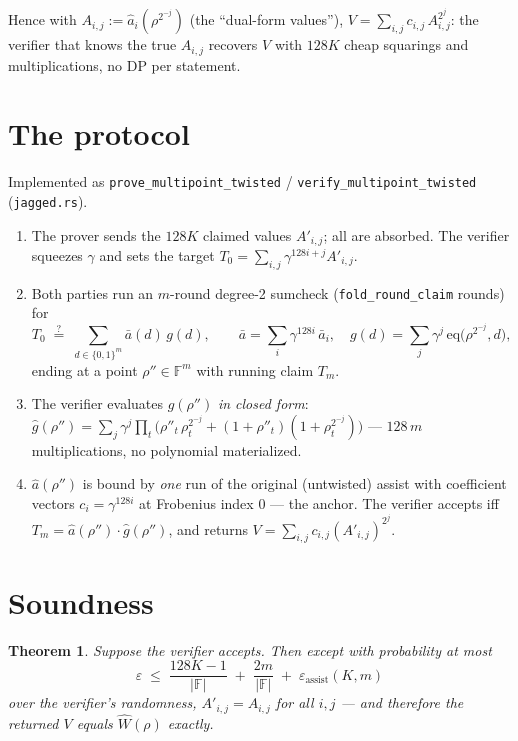 \documentclass[11pt]{article}
\newtheorem{theorem}{Theorem}
\newcommand{\F}{\mathbb{F}}
\newcommand{\eq}{\mathrm{eq}}
\newcommand{\code}[1]{\texttt{#1}}
\begin{document}
Hence with $A_{i,j} := \hat a_i(\rho^{2^{-j}})$ (the ``dual-form values''),
$V = \sum_{i,j} c_{i,j}\, A_{i,j}^{2^j}$: the verifier that knows the true
$A_{i,j}$ recovers $V$ with $128K$ cheap squarings and multiplications, no
DP per statement.

\section{The protocol}

Implemented as \code{prove\_multipoint\_twisted} /
\code{verify\_multipoint\_twisted} (\code{jagged.rs}).

\begin{enumerate}[nosep]
  \item The prover sends the $128K$ claimed values $A'_{i,j}$; all are
        absorbed. The verifier squeezes $\gamma$ and sets the target
        $T_0 = \sum_{i,j} \gamma^{128 i + j} A'_{i,j}$.
  \item Both parties run an $m$-round degree-2 sumcheck
        (\code{fold\_round\_claim} rounds) for
        \[
          T_0 \;\stackrel{?}{=}\; \sum_{d\in\{0,1\}^m} \bar a(d)\, g(d),
          \qquad
          \bar a = \sum_i \gamma^{128 i}\,\bar a_i,\quad
          g(d) = \sum_j \gamma^{j}\,\eq\bigl(\rho^{2^{-j}},d\bigr),
        \]
        ending at a point $\rho''\in\F^m$ with running claim $T_m$.
  \item The verifier evaluates $\hat g(\rho'')$ \emph{in closed form}:
        $\hat g(\rho'') = \sum_j \gamma^j \prod_t \bigl(\rho''_t\,
        \rho^{2^{-j}}_t + (1+\rho''_t)(1+\rho^{2^{-j}}_t)\bigr)$ — $128\,m$
        multiplications, no polynomial materialized.
  \item $\hat a(\rho'')$ is bound by \emph{one} run of the original
        (untwisted) assist with coefficient vectors
        $c_i = \gamma^{128 i}$ at Frobenius index $0$ — the anchor. The
        verifier accepts iff $T_m = \hat a(\rho'')\cdot \hat g(\rho'')$, and
        returns $V = \sum_{i,j} c_{i,j} (A'_{i,j})^{2^j}$.
\end{enumerate}

\section{Soundness}

\begin{theorem}
Suppose the verifier accepts. Then except with probability at most
\[
  \varepsilon \;\le\; \frac{128K - 1}{|\F|} \;+\; \frac{2m}{|\F|}
  \;+\; \varepsilon_{\mathrm{assist}}(K, m)
\]
over the verifier's randomness, $A'_{i,j} = A_{i,j}$ for all $i,j$ — and
therefore the returned $V$ equals $\widehat W(\rho)$ exactly.
\end{theorem}
\end{document}
